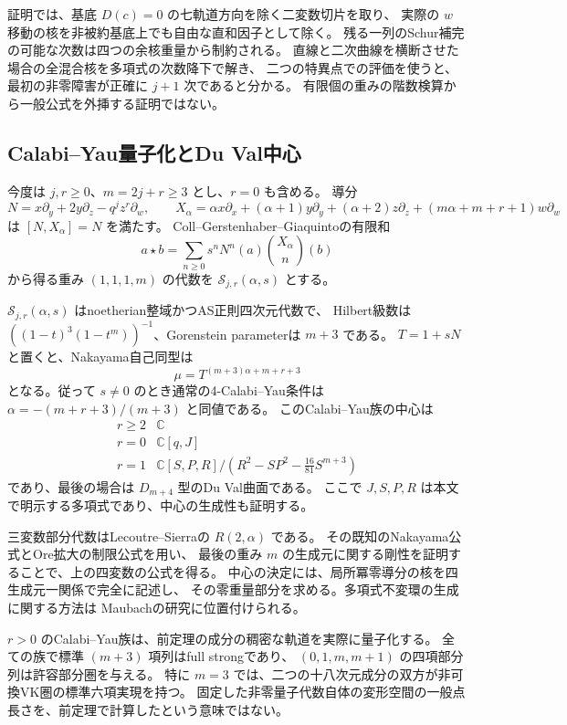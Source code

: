 証明では、基底 $D(c)=0$ の七軌道方向を除く二変数切片を取り、
実際の $w$ 移動の核を非被約基底上でも自由な直和因子として除く。
残る一列のSchur補完の可能な次数は四つの余核重量から制約される。
直線と二次曲線を横断させた場合の全混合核を多項式の次数降下で解き、
二つの特異点での評価を使うと、最初の非零障害が正確に $j+1$ 次であると分かる。
有限個の重みの階数検算から一般公式を外挿する証明ではない。

\subsection{Calabi--Yau量子化とDu Val中心}

今度は $j,r\ge0$、$m=2j+r\ge3$ とし、$r=0$ も含める。
導分
\[
 N=x\partial_y+2y\partial_z-q^jz^r\partial_w,\qquad
 X_\alpha=\alpha x\partial_x+(\alpha+1)y\partial_y+(\alpha+2)z\partial_z
                +(m\alpha+m+r+1)w\partial_w
\]
は $[N,X_\alpha]=N$ を満たす。
Coll--Gerstenhaber--Giaquintoの有限和
\[
 a\star b=\sum_{n\ge0}s^nN^n(a)\binom{X_\alpha}{n}(b)
\]
から得る重み $(1,1,1,m)$ の代数を $\mathcal S_{j,r}(\alpha,s)$ とする。

\begin{theorem}[Nakayama公式と中心]
\label{thm:main-quantum-v34}
$\mathcal S_{j,r}(\alpha,s)$ はnoetherian整域かつAS正則四次元代数で、
Hilbert級数は $((1-t)^3(1-t^m))^{-1}$、Gorenstein parameterは $m+3$ である。
$T=1+sN$ と置くと、Nakayama自己同型は
\[
 \boxed{\mu=T^{(m+3)\alpha+m+r+3}}
\]
となる。従って $s\ne0$ のとき通常の4-Calabi--Yau条件は
$\alpha=-(m+r+3)/(m+3)$ と同値である。
このCalabi--Yau族の中心は
\[
 \begin{array}{c|c}
 r\ge2&\mathbb C\\
 r=0&\mathbb C[q,J]\\
 r=1&\mathbb C[S,P,R]/(R^2-SP^2-\tfrac{16}{81}S^{m+3})
 \end{array}
\]
であり、最後の場合は $D_{m+4}$ 型のDu Val曲面である。
ここで $J,S,P,R$ は本文で明示する多項式であり、中心の生成性も証明する。
\end{theorem}

三変数部分代数はLecoutre--Sierraの $R(2,\alpha)$ である。
その既知のNakayama公式\cite[Theorem 4.16]{LecoutreSierra2019}とOre拡大の制限公式を用い、
最後の重み $m$ の生成元に関する剛性を証明することで、上の四変数の公式を得る。
中心の決定には、局所冪零導分の核を四生成元一関係で完全に記述し、
その零重量部分を求める。多項式不変環の生成に関する方法は
Maubach\cite{Maubach2000}の研究に位置付けられる。

$r>0$ のCalabi--Yau族は、前定理の成分の稠密な軌道を実際に量子化する。
全ての族で標準 $(m+3)$ 項列はfull strongであり、
$(0,1,m,m+1)$ の四項部分列は許容部分圏を与える。
特に $m=3$ では、二つの十八次元成分の双方が非可換VK圏の標準六項実現を持つ。
固定した非零量子代数自体の変形空間の一般点長さを、前定理で計算したという意味ではない。

